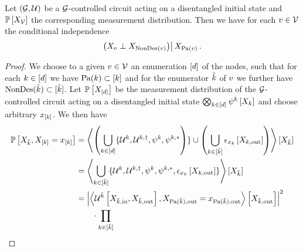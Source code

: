 \begin{lemma}
    Let $(\mathcal{G},\mathcal{U})$ be a $\mathcal{G}$-controlled circuit acting on a disentangled initial state and $\mathbb{P}\left[X_{\mathcal{V}}\right]$ the corresponding measurement distribution.
    Then we have for each $v\in\mathcal{V}$ the conditional independence
    \begin{align*}
        \left(X_{v}\perp X_{\mathrm{NonDes}(v)}\middle)\right| X_{\mathrm{Pa}(v)} \, .
    \end{align*}
\end{lemma}
\begin{proof}
    We choose to a given $v\in\mathcal{V}$ an enumeration $[d]$ of the nodes, such that for each $k\in[d]$ we have $\mathrm{Pa}(k)\subset[k]$ and for the enumerator $\tilde{k}$ of $v$ we further have $\mathrm{NonDes}(\tilde{k})\subset[\tilde{k}]$.
    Let $\mathbb{P}\left[X_{[d]}\right]$ be the measurement distribution of the $\mathcal{G}$-controlled circuit acting on a disentangled initial state $\bigotimes_{k\in[d]}\psi^{k}\left[X_{k}\right]$ and choose arbitrary $x_{[k]}$.
    We then have
    \begin{align*}
        \probat{\catvariableof{\seccatenumerator},\indexedcatvariableof{[\catenumerator]}}
        &= \contractionof{\left(\bigcup_{\catenumeratorin}\{\contunitaryof{\catenumerator},\contunitaryof{\catenumerator,\dagger},\qstateof{\catenumerator},\qstateof{\catenumerator,*}\right)\}
        \cup \left(\bigcup_{\catenumerator\in[\seccatenumerator]} \onehotmapofat{\catindexof{\catenumerator}}{\catvariableof{\catenumerator,\outsymbol}}\right)
        }{
            \catvariableof{\seccatenumerator}
        } \\
        &= \contractionof{\bigcup_{\catenumerator\in[\seccatenumerator]}\{\contunitaryof{\catenumerator},\contunitaryof{\catenumerator,\dagger},\qstateof{\catenumerator},\qstateof{\catenumerator,*},\onehotmapofat{\catindexof{\catenumerator}}{\catvariableof{\catenumerator,\outsymbol}}\}}{
            \catvariableof{\seccatenumerator}
        } \\
        & = \absof{\contractionof{\contunitaryofat{\seccatenumerator}{\catvariableof{\seccatenumerator,\insymbol},\catvariableof{\seccatenumerator,\outsymbol}},\indexedcatvariableof{\parentsof{\seccatenumerator},\outsymbol}}{\catvariableof{\seccatenumerator,\outsymbol}}}^2 \\
        & \quad \quad \cdot \prod_{\catenumerator\in[\seccatenumerator]}

\end{align*}
\end{proof}
